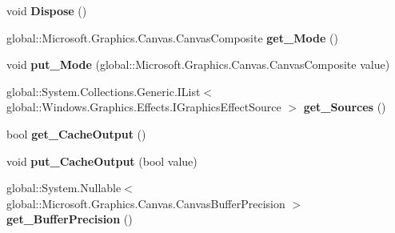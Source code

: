 \begin{DoxyCompactItemize}
void {\bfseries Dispose} ()
\item 
\mbox{\label{class_microsoft_1_1_graphics_1_1_canvas_1_1_effects_1_1_composite_effect_a0dfe9fcf616917956fcad2cd37bb9866}} 
global\+::\+Microsoft.\+Graphics.\+Canvas.\+Canvas\+Composite {\bfseries get\+\_\+\+Mode} ()
\item 
\mbox{\label{class_microsoft_1_1_graphics_1_1_canvas_1_1_effects_1_1_composite_effect_ae7ce16aff8d9ed99b8886bff661b4e20}} 
void {\bfseries put\+\_\+\+Mode} (global\+::\+Microsoft.\+Graphics.\+Canvas.\+Canvas\+Composite value)
\item 
\mbox{\label{class_microsoft_1_1_graphics_1_1_canvas_1_1_effects_1_1_composite_effect_a8478bf885b21b246f10dc2bf0558e37c}} 
global\+::\+System.\+Collections.\+Generic.\+I\+List$<$ global\+::\+Windows.\+Graphics.\+Effects.\+I\+Graphics\+Effect\+Source $>$ {\bfseries get\+\_\+\+Sources} ()
\item 
\mbox{\label{class_microsoft_1_1_graphics_1_1_canvas_1_1_effects_1_1_composite_effect_a3c66fe91b91cc425331cdcb4f41beba8}} 
bool {\bfseries get\+\_\+\+Cache\+Output} ()
\item 
\mbox{\label{class_microsoft_1_1_graphics_1_1_canvas_1_1_effects_1_1_composite_effect_a39920fed4de684b9667e7d93c63dbb0c}} 
void {\bfseries put\+\_\+\+Cache\+Output} (bool value)
\item 
\mbox{\label{class_microsoft_1_1_graphics_1_1_canvas_1_1_effects_1_1_composite_effect_ac433461e33a3e94122754d4e470ae2a8}} 
global\+::\+System.\+Nullable$<$ global\+::\+Microsoft.\+Graphics.\+Canvas.\+Canvas\+Buffer\+Precision $>$ {\bfseries get\+\_\+\+Buffer\+Precision} ()
\item 
\mbox{\label{class_microsoft_1_1_graphics_1_1_canvas_1_1_effects_1_1_composite_effect_ad0b7d7f2cc2acbb85fe495fed77f265d}} 

\end{DoxyCompactItemize}

